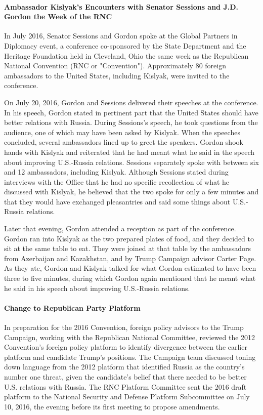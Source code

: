 \paragraph{Ambassador Kislyak's Encounters with Senator Sessions and J.D. Gordon the Week of the RNC}

In July 2016, Senator Sessions and Gordon spoke at the Global Partners in Diplomacy event, a conference co-sponsored by the State Department and the Heritage Foundation held in Cleveland, Ohio the same week as the Republican National Convention (RNC or "Convention").%
Approximately 80 foreign ambassadors to the United States, including Kislyak, were invited to the conference.%

On July 20, 2016, Gordon and Sessions delivered their speeches at the conference.%
In his speech, Gordon stated in pertinent part that the United States should have better relations with Russia.%
During Sessions's speech, he took questions from the audience, one of which may have been asked by Kislyak.%
When the speeches concluded, several ambassadors lined up to greet the speakers.%
Gordon shook hands with Kislyak and reiterated that he had meant what he said in the speech about improving U.S.-Russia relations.%
Sessions separately spoke with between six and 12 ambassadors, including Kislyak.%
Although Sessions stated during interviews with the Office that he had no specific recollection of what he discussed with Kislyak, he believed that the two spoke for only a few minutes and that they would have exchanged pleasantries and said some things about U.S.-Russia relations.%

Later that evening, Gordon attended a reception as part of the conference.%
Gordon ran into Kislyak as the two prepared plates of food, and they decided to sit at the same table to eat.%
They were joined at that table by the ambassadors from Azerbaijan and Kazakhstan, and by Trump Campaign advisor Carter Page.%
As they ate, Gordon and Kislyak talked for what Gordon estimated to have been three to five minutes, during which Gordon again mentioned that he meant what he said in his speech about improving U.S.-Russia relations.%

\paragraph{Change to Republican Party Platform}

In preparation for the 2016 Convention, foreign policy advisors to the Trump Campaign, working with the Republican National Committee, reviewed the 2012 Convention's foreign policy platform to identify divergence between the earlier platform and candidate Trump's positions.%
The Campaign team discussed toning down language from the 2012 platform that identified Russia as the country's number one threat, given the candidate's belief that there needed to be better U.S. relations with Russia.%
The RNC Platform Committee sent the 2016 draft platform to the National Security and Defense Platform Subcommittee on July 10, 2016, the evening before its first meeting to propose amendments.%

